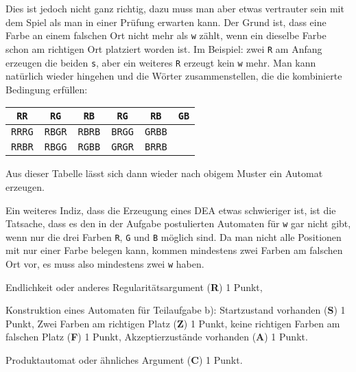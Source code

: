 \begin{loesung}
\begin{teilaufgaben}
Dies ist jedoch nicht ganz richtig, dazu muss man aber etwas vertrauter sein
mit dem Spiel als man in einer Prüfung erwarten kann.
Der Grund ist, dass eine Farbe an einem falschen Ort nicht mehr als \texttt{w}
zählt, wenn ein dieselbe Farbe schon am richtigen Ort platziert worden ist.
Im Beispiel: zwei \texttt{R} am Anfang erzeugen die beiden \texttt{s}, aber ein
weiteres \texttt{R} erzeugt kein \texttt{w} mehr.
Man kann natürlich wieder hingehen und die Wörter zusammenstellen, die die
kombinierte Bedingung erfüllen:
\begin{center}
\def\b{\blank}
\begin{tabular}{|cccccc|}
\hline
\texttt{RR\b\b}&\texttt{R\b G\b}&\texttt{R\b\b B}&\texttt{\b RG\b}&\texttt{\b R\b B}&\texttt{\b\b GB}\\
\hline
\texttt{RRRG}&\texttt{RBGR}&\texttt{RBRB}&\texttt{BRGG}&\texttt{GRBB}&             \\
\texttt{RRBR}&\texttt{RBGG}&\texttt{RGBB}&\texttt{GRGR}&\texttt{BRRB}&             \\
\hline
\end{tabular}
\end{center}
Aus dieser Tabelle lässt sich dann wieder nach obigem Muster ein
Automat erzeugen.

Ein weiteres Indiz, dass die Erzeugung eines DEA etwas schwieriger
ist, ist die Tatsache, dass es den in der Aufgabe postulierten
Automaten für \texttt{w} gar nicht gibt, wenn nur die drei Farben
\texttt{R}, \texttt{G} und \texttt{B} möglich sind.
Da man nicht alle Positionen mit nur einer Farbe belegen kann,
kommen mindestens zwei Farben am falschen Ort vor, es muss also
mindestens zwei \texttt{w} haben.
\end{teilaufgaben}
\end{loesung}


\begin{bewertung}
\begin{teilaufgaben}
\item
Endlichkeit oder anderes Regularitätsargument ({\bf R}) 1 Punkt,
\item
Konstruktion eines Automaten für Teilaufgabe b):
Startzustand vorhanden ({\bf S}) 1 Punkt,
Zwei Farben am richtigen Platz ({\bf Z}) 1 Punkt,
keine richtigen Farben am falschen Platz ({\bf F}) 1 Punkt,
Akzeptierzustände vorhanden ({\bf A}) 1 Punkt.
\item
Produktautomat oder ähnliches Argument ({\bf C}) 1 Punkt.
\end{teilaufgaben}
\end{bewertung}





